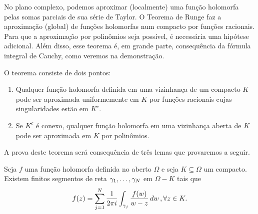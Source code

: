     No plano complexo, podemos aproximar (localmente) uma função holomorfa pelas somas parciais 
    de sua série de Taylor. O Teorema de Runge faz a aproximação (global) de funções holomorfas 
    num compacto por funções racionais. Para que a aproximação por polinômios seja possível, 
    é necessária uma hipótese adicional. Além disso, esse teorema é, em grande parte, 
    consequência da fórmula integral de Cauchy, como veremos na demonstração.
    \begin{teorema}[Runge]
    \label{TR}
        O teorema consiste de dois pontos:
        \begin{enumerate}
            \item Qualquer função holomorfa definida em uma vizinhança de um compacto $K$ 
            pode ser aproximada uniformemente em $K$ por funções racionais cujas singularidades 
            estão em $K^c$.
            \item Se $K^c$ é conexo, qualquer função holomorfa em uma vizinhança aberta de $K$ 
            pode ser aproximada em $K$ por polinômios.
        \end{enumerate}
    \end{teorema}
    A prova deste teorema será consequência de três lemas que provaremos a seguir.
    \begin{lema}
    \label{LR1}
        Seja $f$ uma função holomorfa definida no aberto $\Omega$ e seja $K \subseteq \Omega$ 
        um compacto. Existem finitos segmentos de reta $\gamma_1, \dots, \gamma_N$ em 
        $\Omega - K$ tais que
        \begin{equation*}
        f(z) 
        = 
        \sum^{N}_{j=1}\frac{1}{2 \pi i}\int_{\gamma_j}\frac{f(w)}{w-z} \, dw  \, , \forall z \in K.
        \end{equation*}
    \end{lema}
